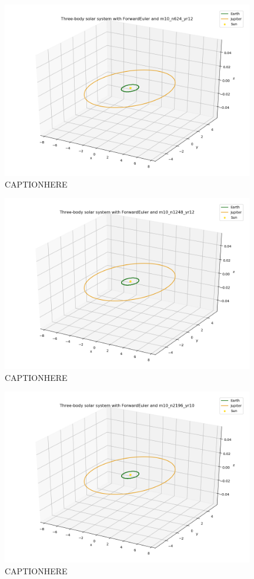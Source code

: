 \documentclass{article}
\begin{document}
    \begin{figure}[H]
        \centering
        \includegraphics[width = 11cm]{img/plot3D_S_E_J_F_m10_n624_yr12.png}
        \caption{CAPTIONHERE}
        \label{fig:plot3D_S_E_J_F_m10_n624_yr12}
    \end{figure}

    \begin{figure}[H]
        \centering
        \includegraphics[width = 11cm]{img/plot3D_S_E_J_F_m10_n1248_yr12.png}
        \caption{CAPTIONHERE}
        \label{fig:plot3D_S_E_J_F_m10_n1248_yr12}
    \end{figure}

    \begin{figure}[H]
        \centering
        \includegraphics[width = 11cm]{img/plot3D_S_E_J_F_m10_n2196_yr10.png}
        \caption{CAPTIONHERE}
        \label{fig:plot3D_S_E_J_F_m10_n2196_yr10}
    \end{figure}
\end{document}
